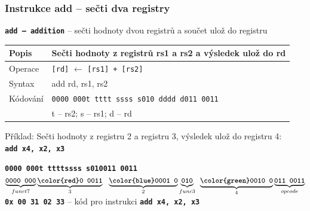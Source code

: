 \documentclass{beamer}
\begin{document}
\begin{frame}
\frametitle{Instrukce add -- sečti dva registry}

\textbf{\texttt{add -- addition}} -- sečti hodnoty dvou registrů a součet ulož do registru

\bigskip

\begin{tabular}{|l|l|}\hline
Popis & Sečti hodnoty z registrů rs1 a rs2 a výsledek ulož do rd \\ \hline
Operace & \texttt{[rd]} $\leftarrow$ \texttt{[rs1] + [rs2]} \\ \hline
Syntax & add rd, rs1, rs2 \\ \hline
Kódování & \texttt{0000 000t tttt ssss s010 dddd d011 0011} \\ 
 & t -- rs2; s -- rs1; d -- rd \\ \hline
\end{tabular}

\bigskip

Příklad: Sečti hodnoty z registru 2 a registru 3, výsledek ulož do registru 4:\\
\textbf{\texttt{add x4, x2, x3}}

\textbf{\texttt{0000 000\hspace{0.08cm}\color{red}t tttt}}\phantom{x}\hspace{0.13cm}\textbf{\texttt{\color{blue}ssss s}}\hspace{0.1cm}\textbf{\texttt{010\hspace{0.05cm}011 0011}}\\
$\underbrace{\textbf{\texttt{0000 000}}}_{funct7}
\underbrace{\textbf{\texttt{\color{red}0 0011}}}_{3}
\texttt{ }\underbrace{\textbf{\texttt{\color{blue}0001 0}}}_{2}
\underbrace{\textbf{\texttt{010}}}_{func3}\phantom{i}
\underbrace{\textbf{\texttt{\color{green}0010 0}}}_{4}
\underbrace{\textbf{\texttt{011 0011}}}_{opcode}$\\

\textbf{\texttt{0x 00 31 02 33}} -- kód pro instrukci \textbf{\texttt{add x4, x2, x3}}


\end{frame}
\end{document}
